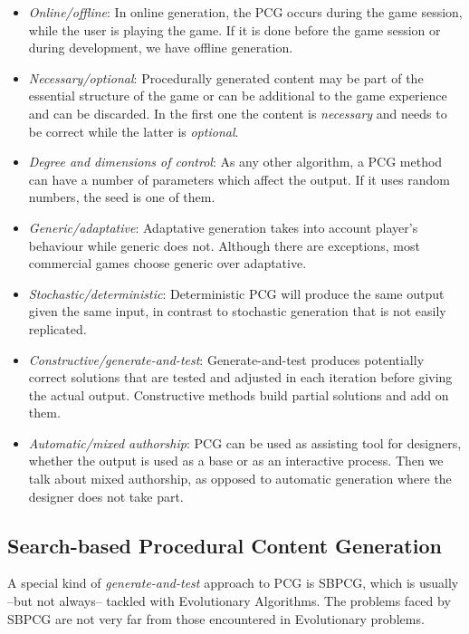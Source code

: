 \begin{itemize}
	\item \textit{Online/offline}: In online generation, the \ac{PCG} occurs during the game session, while the user is playing the game. If it is done before the game session or during development, we have offline generation. 
	\item \textit{Necessary/optional}: Procedurally generated content may be part of the essential structure of the game  or can be additional to the game experience and can be discarded. In the first one the content is \textit{necessary} and needs to be correct while the latter is \textit{optional}.
	\item \textit{Degree and dimensions of control}: As any other algorithm, a \ac{PCG} method can have a number of parameters which affect the output. If it uses random numbers, the seed is one of them.
	\item \textit{Generic/adaptative}: Adaptative generation takes into account player's behaviour while generic does not. Although there are exceptions, most commercial games choose generic over adaptative.
	\item \textit{Stochastic/deterministic}: Deterministic \ac{PCG} will produce the same output given the same input, in contrast to stochastic generation that is not easily replicated.
	\item \textit{Constructive/generate-and-test}: Generate-and-test produces potentially correct solutions that are tested and adjusted in each iteration before giving the actual output. Constructive methods build partial solutions and add on them.
	\item \textit{Automatic/mixed authorship}: \ac{PCG} can be used as assisting tool for designers, whether the output is used as a base or as an interactive process. Then we talk about mixed authorship, as opposed to automatic generation where the designer does not take part. 
\end{itemize}

\subsection{Search-based Procedural Content Generation}

A special kind of \textit{generate-and-test} approach to \ac{PCG} is \acf{SBPCG}, which is usually --but not always-- tackled with Evolutionary Algorithms. The problems faced by \ac{SBPCG} are not very far from those encountered in Evolutionary problems. 

